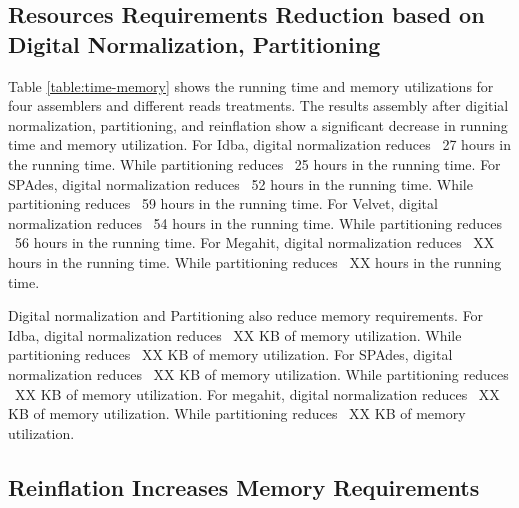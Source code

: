 \subsection*{Resources Requirements Reduction based on Digital Normalization, Partitioning}
Table \ref {table:time-memory}  shows the  running time and memory utilizations for four assemblers and different reads treatments.
The results assembly after digitial normalization, partitioning, and reinflation show a significant decrease in running time and memory utilization.
For Idba, digital normalization reduces ~27 hours in the running time. While partitioning  reduces ~25 hours in the running time. 
For SPAdes, digital normalization reduces ~52 hours in the running time. While partitioning  reduces ~59 hours in the running time. 
For Velvet, digital normalization reduces ~54 hours in the running time. While partitioning  reduces ~56 hours in the running time. 
For Megahit, digital normalization reduces ~XX hours in the running time. While partitioning  reduces ~XX hours in the running time. 

Digital normalization and Partitioning also reduce memory requirements. For Idba, digital normalization reduces ~XX KB of memory utilization. While partitioning reduces ~XX KB of memory utilization.
For SPAdes, digital normalization reduces ~XX KB of memory utilization. While partitioning reduces ~XX KB of memory utilization.
For megahit, digital normalization reduces ~XX KB of memory utilization. While partitioning reduces ~XX KB of memory utilization.

 

\subsection*{Reinflation Increases Memory Requirements}

 
